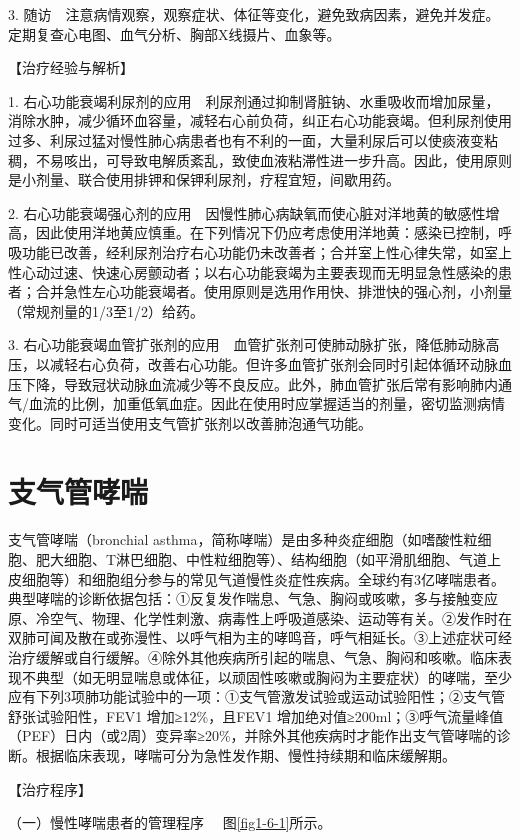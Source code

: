 3.
随访　注意病情观察，观察症状、体征等变化，避免致病因素，避免并发症。定期复查心电图、血气分析、胸部X线摄片、血象等。

【治疗经验与解析】

1.
右心功能衰竭利尿剂的应用　利尿剂通过抑制肾脏钠、水重吸收而增加尿量，消除水肿，减少循环血容量，减轻右心前负荷，纠正右心功能衰竭。但利尿剂使用过多、利尿过猛对慢性肺心病患者也有不利的一面，大量利尿后可以使痰液变粘稠，不易咳出，可导致电解质紊乱，致使血液粘滞性进一步升高。因此，使用原则是小剂量、联合使用排钾和保钾利尿剂，疗程宜短，间歇用药。

2.
右心功能衰竭强心剂的应用　因慢性肺心病缺氧而使心脏对洋地黄的敏感性增高，因此使用洋地黄应慎重。在下列情况下仍应考虑使用洋地黄：感染已控制，呼吸功能已改善，经利尿剂治疗右心功能仍未改善者；合并室上性心律失常，如室上性心动过速、快速心房颤动者；以右心功能衰竭为主要表现而无明显急性感染的患者；合并急性左心功能衰竭者。使用原则是选用作用快、排泄快的强心剂，小剂量（常规剂量的1/3至1/2）给药。

3.
右心功能衰竭血管扩张剂的应用　血管扩张剂可使肺动脉扩张，降低肺动脉高压，以减轻右心负荷，改善右心功能。但许多血管扩张剂会同时引起体循环动脉血压下降，导致冠状动脉血流减少等不良反应。此外，肺血管扩张后常有影响肺内通气/血流的比例，加重低氧血症。因此在使用时应掌握适当的剂量，密切监测病情变化。同时可适当使用支气管扩张剂以改善肺泡通气功能。

\section{支气管哮喘}

支气管哮喘（bronchial
asthma，简称哮喘）是由多种炎症细胞（如嗜酸性粒细胞、肥大细胞、T淋巴细胞、中性粒细胞等）、结构细胞（如平滑肌细胞、气道上皮细胞等）和细胞组分参与的常见气道慢性炎症性疾病。全球约有3亿哮喘患者。典型哮喘的诊断依据包括：①反复发作喘息、气急、胸闷或咳嗽，多与接触变应原、冷空气、物理、化学性刺激、病毒性上呼吸道感染、运动等有关。②发作时在双肺可闻及散在或弥漫性、以呼气相为主的哮鸣音，呼气相延长。③上述症状可经治疗缓解或自行缓解。④除外其他疾病所引起的喘息、气急、胸闷和咳嗽。临床表现不典型（如无明显喘息或体征，以顽固性咳嗽或胸闷为主要症状）的哮喘，至少应有下列3项肺功能试验中的一项：①支气管激发试验或运动试验阳性；②支气管舒张试验阳性，FEV{1}
增加≥12\%，且FEV{1}
增加绝对值≥200ml；③呼气流量峰值（PEF）日内（或2周）变异率≥20\%，并除外其他疾病时才能作出支气管哮喘的诊断。根据临床表现，哮喘可分为急性发作期、慢性持续期和临床缓解期。

【治疗程序】

{（一）慢性哮喘患者的管理程序} 　图\ref{fig1-6-1}所示。

